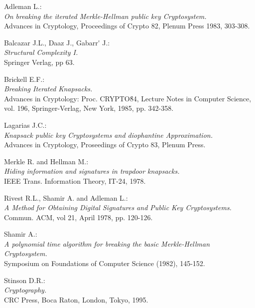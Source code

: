 \newpage
\begin{thebibliography}{99}

    
       Adleman L.: \\ 
       \emph{On breaking the iterated Merkle-Hellman public key 
             Cryptosystem.} \\ 
       Advances in Cryptology, Proceedings of Crypto 82, 
       Plenum Press 1983, 303-308.

     
       Balcazar J.L., Daaz J., Gabarr\'{} J.: \\ 
       \emph{Structural Complexity I.} \\ 
       Springer Verlag, pp 63.
           
     
       Brickell E.F.: \\
       \emph{Breaking Iterated Knapsacks.}  \\
       Advances in Cryptology: Proc. CRYPTO\'84, 
       Lecture Notes in Computer Science, vol. 196, 
       Springer-Verlag, New York, 1985, pp. 342-358.

      
       Lagarias J.C.: \\
       \emph{Knapsack public key Cryptosystems and diophantine
             Approximation.} \\
       Advances in Cryptology, Proseedings of Crypto 83, Plenum Press.

      
       Merkle R. and Hellman M.: \\
       \emph{Hiding information and signatures in trapdoor knapsacks.} \\
       IEEE Trans. Information Theory, IT-24, 1978.

     
       Rivest R.L., Shamir A. and Adleman L.: \\
       \emph{A Method for Obtaining Digital Signatures and 
             Public Key Cryptosystems.} \\
       Commun. ACM, vol 21, April 1978, pp. 120-126.

     
       Shamir A.: \\
       \emph{A polynomial time algorithm for breaking the basic 
             Merkle-Hellman Cryptosystem.} \\
       Symposium on Foundations of Computer Science (1982), 145-152.
           
     
       Stinson D.R.: \\
       \emph{Cryptography.} \\
       CRC Press, Boca Raton, London, Tokyo, 1995.

\end{thebibliography}


